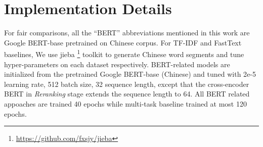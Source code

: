 \section{Implementation Details}
\label{appdix:exp detail}
For fair comparisons, 
all the ``BERT'' abbreviations mentioned in this work are Google BERT-base pretrained on Chinese corpus. 
For TF-IDF and FastText baselines, We use jieba
\footnote{\href{https://github.com/fxsjy/jieba}{https://github.com/fxsjy/jieba}}
toolkit to generate Chinese word segments and tune hyper-parameters on each dataset respectively. 
BERT-related models are initialized from the pretrained Google BERT-base (Chinese) and tuned with 2e-5 learning rate, 512 batch size, 32 sequence length, except that the cross-encoder BERT in \textit{Reranking} stage extends the sequence length to 64. 
All BERT related appoaches are trained 40 epochs while multi-task baseline trained at most 120 epochs. 

